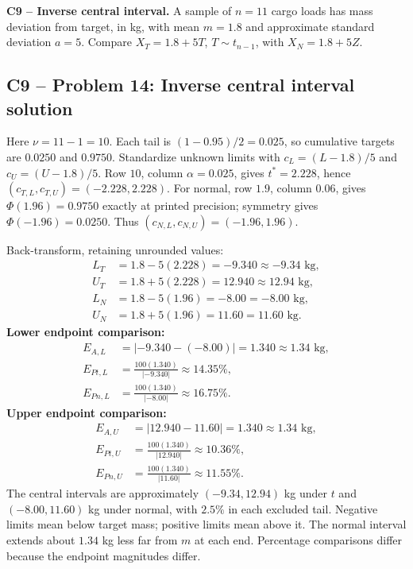 {
\textbf{C9 -- Inverse central interval.} A sample of $n=11$ cargo loads has mass deviation from target, in kg, with mean $m=1.8$ and approximate standard deviation $a=5$. Compare $X_T=1.8+5T$, $T\sim t_{n-1}$, with $X_N=1.8+5Z$.
\label{sol:q14}
\subsection*{C9 -- Problem 14: Inverse central interval solution }
Here $\nu=11-1=10$. Each tail is $(1-0.95)/2=0.025$, so cumulative targets are $0.0250$ and $0.9750$.
Standardize unknown limits with $c_L=(L-1.8)/5$ and $c_U=(U-1.8)/5$.
Row $10$, column $\alpha=0.025$, gives $t^*=2.228$, hence $(c_{T,L},c_{T,U})=(-2.228,2.228)$.
For normal, row $1.9$, column $0.06$, gives $\Phi(1.96)=0.9750$ exactly at printed precision; symmetry gives $\Phi(-1.96)=0.0250$.
Thus $(c_{N,L},c_{N,U})=(-1.96,1.96)$.

Back-transform, retaining unrounded values:
\[
 \begin{aligned}
 L_T&=1.8-5(2.228)=-9.340\approx\boxed{-9.34\text{ kg}},\\
 U_T&=1.8+5(2.228)=12.940\approx\boxed{12.94\text{ kg}},\\
 L_N&=1.8-5(1.96)=-8.00=\boxed{-8.00\text{ kg}},\\
 U_N&=1.8+5(1.96)=11.60=\boxed{11.60\text{ kg}}.
 \end{aligned}
\]
\textbf{Lower endpoint comparison:}
\[
 \begin{aligned}
 E_{A,L}&=|-9.340-(-8.00)|=1.340\approx\boxed{1.34\text{ kg}},\\
 E_{Pt,L}&=\frac{100(1.340)}{|-9.340|}\approx\boxed{14.35\%},\\
 E_{Pn,L}&=\frac{100(1.340)}{|-8.00|}\approx\boxed{16.75\%}.
 \end{aligned}
\]
\textbf{Upper endpoint comparison:}
\[
 \begin{aligned}
 E_{A,U}&=|12.940-11.60|=1.340\approx\boxed{1.34\text{ kg}},\\
 E_{Pt,U}&=\frac{100(1.340)}{|12.940|}\approx\boxed{10.36\%},\\
 E_{Pn,U}&=\frac{100(1.340)}{|11.60|}\approx\boxed{11.55\%}.
 \end{aligned}
\]
The central intervals are approximately $(-9.34,12.94)$ kg under $t$ and $(-8.00,11.60)$ kg under normal, with $2.5\%$ in each excluded tail.
Negative limits mean below target mass; positive limits mean above it.
The normal interval extends about $1.34$ kg less far from $m$ at each end.
Percentage comparisons differ because the endpoint magnitudes differ.
\secInicio[sec:q14]
}


